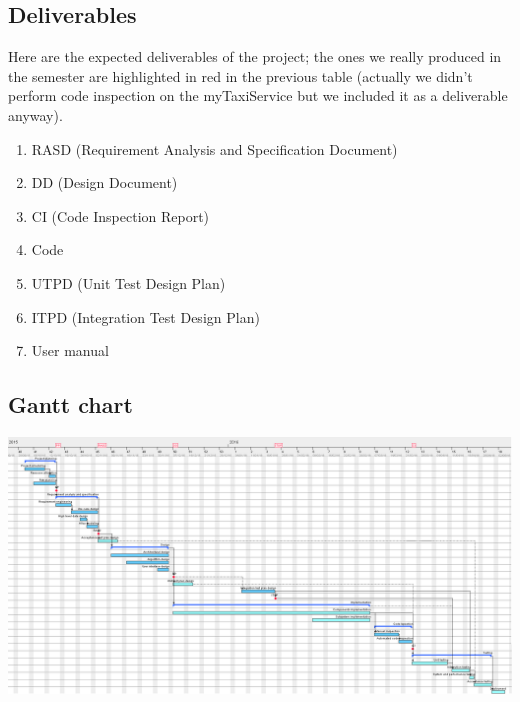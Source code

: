 \subsection{Deliverables}

Here are the expected deliverables of the project; the ones we really
produced in the semester are highlighted in red in the previous table
(actually we didn't perform code inspection on the myTaxiService but
we included it as a deliverable anyway).
\begin{enumerate}
\item RASD (Requirement Analysis and Specification Document) 
\item DD (Design Document)
\item CI (Code Inspection Report)
\item Code
\item UTPD (Unit Test Design Plan)
\item ITPD (Integration Test Design Plan)
\item User manual
\end{enumerate}
\begin{landscape}



\subsection{Gantt chart}

\medskip{}


\includegraphics[scale=0.53]{tasks/gantt}

\restoregeometry

\end{landscape}
